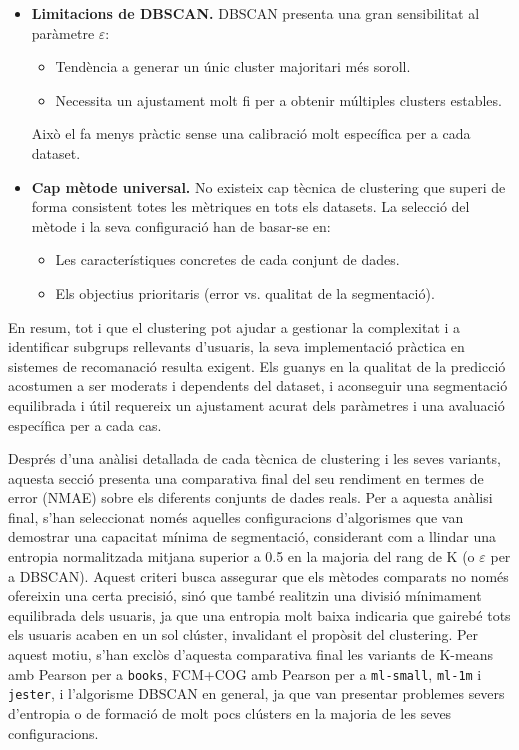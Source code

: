 \documentclass[a4paper,12pt]{report}
\begin{document}
\begin{itemize}
  \item \textbf{Limitacions de DBSCAN.}
    DBSCAN presenta una gran sensibilitat al paràmetre \(\varepsilon\):
    \begin{itemize}
      \item Tendència a generar un únic cluster majoritari més soroll.
      \item Necessita un ajustament molt fi per a obtenir múltiples clusters estables.
    \end{itemize}
    Això el fa menys pràctic sense una calibració molt específica per a cada dataset.

  \item \textbf{Cap mètode universal.}
    No existeix cap tècnica de clustering que superi de forma consistent totes les mètriques en tots els datasets. La selecció del mètode i la seva configuració han de basar-se en:
    \begin{itemize}
      \item Les característiques concretes de cada conjunt de dades.
      \item Els objectius prioritaris (error vs. qualitat de la segmentació).
    \end{itemize}
\end{itemize}

En resum, tot i que el clustering pot ajudar a gestionar la complexitat i a identificar subgrups rellevants d’usuaris, la seva implementació pràctica en sistemes de recomanació resulta exigent. Els guanys en la qualitat de la predicció acostumen a ser moderats i dependents del dataset, i aconseguir una segmentació equilibrada i útil requereix un ajustament acurat dels paràmetres i una avaluació específica per a cada cas. 

Després d'una anàlisi detallada de cada tècnica de clustering i les seves variants, aquesta secció presenta una comparativa final del seu rendiment en termes de error (NMAE) sobre els diferents conjunts de dades reals. Per a aquesta anàlisi final, s'han seleccionat només aquelles configuracions d'algorismes que van demostrar una capacitat mínima de segmentació, considerant com a llindar una entropia normalitzada mitjana superior a 0.5 en la majoria del rang de K (o \(\varepsilon\) per a DBSCAN). Aquest criteri busca assegurar que els mètodes comparats no només ofereixin una certa precisió, sinó que també realitzin una divisió mínimament equilibrada dels usuaris, ja que una entropia molt baixa indicaria que gairebé tots els usuaris acaben en un sol clúster, invalidant el propòsit del clustering. Per aquest motiu, s'han exclòs d'aquesta comparativa final les variants de K-means amb Pearson per a \texttt{books}, FCM+COG amb Pearson per a \texttt{ml-small}, \texttt{ml-1m} i \texttt{jester}, i l'algorisme DBSCAN en general, ja que van presentar problemes severs d'entropia o de formació de molt pocs clústers en la majoria de les seves configuracions.
\end{document}
